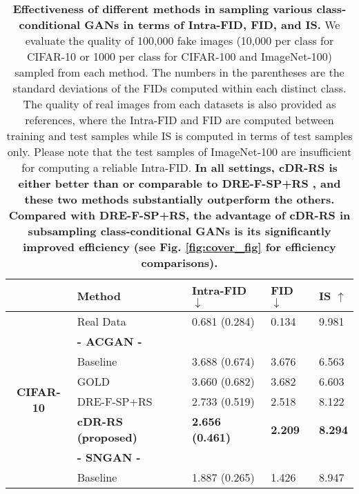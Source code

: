 \documentclass[final,12pt, 3p,times]{elsarticle}
\begin{document}
\begin{table}[htbp]
	\centering
	\caption{\textbf{Effectiveness of different methods in sampling various class-conditional GANs in terms of Intra-FID, FID, and IS.} We evaluate the quality of 100,000 fake images (10,000 per class for CIFAR-10 or 1000 per class for CIFAR-100 and ImageNet-100) sampled from each method. The numbers in the parentheses are the standard deviations of the FIDs computed within each distinct class. The quality of real images from each datasets is also provided as references, where the Intra-FID and FID are computed between training and test samples while IS is computed in terms of test samples only. Please note that the test samples of ImageNet-100 are insufficient for computing a reliable Intra-FID. \textbf{In all settings, cDR-RS is either better than or comparable to DRE-F-SP+RS \cite{ding2020subsampling}, and these two methods substantially outperform the others. Compared with DRE-F-SP+RS, the advantage of cDR-RS in subsampling class-conditional GANs is its significantly improved efficiency (see Fig. \ref{fig:cover_fig} for efficiency comparisons). }}
	\begin{adjustbox}{width=0.5\textwidth}
		\begin{tabular}{rllll}
			\toprule
			& \textbf{Method} & \textbf{Intra-FID} $\downarrow$ & \textbf{FID} $\downarrow$ & \textbf{IS} $\uparrow$ \\
			\midrule
			\multicolumn{1}{c}{\multirow{20}[0]{*}{\begin{sideways}\textbf{CIFAR-10}\end{sideways}}} & Real Data & 0.681 (0.284) & 0.134 & 9.981 \\
			\cline{2-5}
			\multicolumn{1}{c}{} & \textbf{- ACGAN -} &       &       &  \\
			\multicolumn{1}{c}{} & Baseline & 3.688 (0.674) & 3.676 & 6.563 \\
			\multicolumn{1}{c}{} & GOLD \cite{mo2019mining} & 3.660 (0.682) & 3.682 & 6.603 \\
			\multicolumn{1}{c}{} & DRE-F-SP+RS \cite{ding2020subsampling} & 2.733 (0.519) & 2.518 & 8.122 \\
			\multicolumn{1}{c}{} & \textbf{cDR-RS (proposed)} & \textbf{2.656 (0.461)} & \textbf{2.209} & \textbf{8.294} \\
			\cline{2-5}
			\multicolumn{1}{c}{} & \textbf{- SNGAN -} &       &       &  \\
			\multicolumn{1}{c}{} & Baseline & 1.887 (0.265) & 1.426 & 8.947 \\

\end{tabular}
\end{adjustbox}
\end{table}
\end{document}
